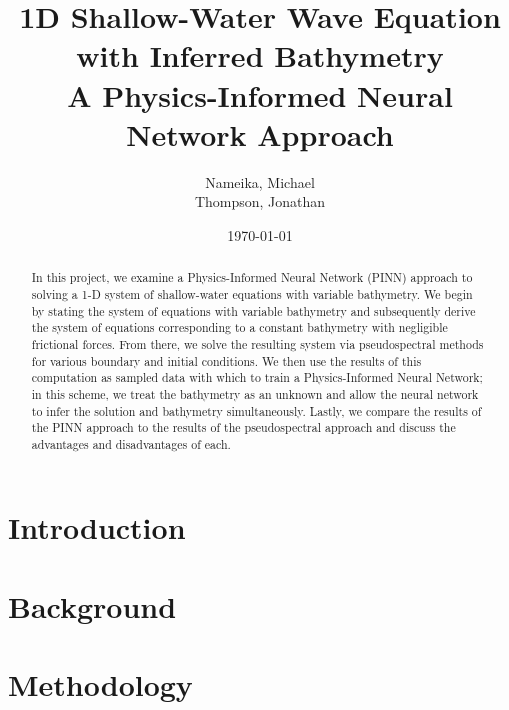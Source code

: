 \documentclass[letterpaper,12pt]{article}
\begin{document}
    \title{\vspace{1.0in}%
        1D Shallow-Water Wave Equation with Inferred Bathymetry\\
        \large A Physics-Informed Neural Network Approach
    }
    \author{%
        Nameika, Michael \\
        Thompson, Jonathan
    }
    \date{\today}

    \maketitle

    \vspace*{1.0in}

    \begin{abstract}
        In this project, we examine a Physics-Informed Neural Network (PINN) approach to solving a 1-D system of 
        shallow-water equations with variable bathymetry. We begin by stating the system of equations with variable
        bathymetry and subsequently derive the system of equations corresponding to a constant bathymetry with negligible
        frictional forces. From there, we solve the resulting system via pseudospectral methods for various boundary
        and initial conditions. We then use the results of this computation as sampled data with which to train a 
        Physics-Informed Neural Network; in this scheme, we treat the bathymetry as an unknown and allow the 
        neural network to infer the solution and bathymetry simultaneously. Lastly, we compare the results of the PINN
        approach to the results of the pseudospectral approach and discuss the advantages and disadvantages of each.
    \end{abstract}

    \pagebreak

    \section{Introduction}\label{sec:introduction}
        

    \section{Background}\label{sec:background}
        

    \section{Methodology}\label{sec:proposed-methodology}
        
\end{document}
